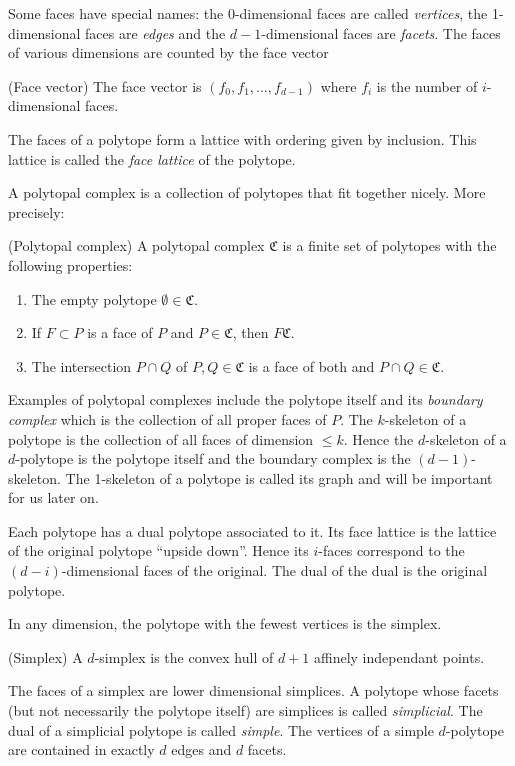 Some faces have special names: the 0-dimensional faces are called 
\textit{vertices}, the 1-dimensional faces are \textit{edges} and the 
$d-1$-dimensional faces are \textit{facets}. The faces of various dimensions 
are counted by the face vector
\begin{definition}
 (Face vector) The face vector is $(f_0, f_1, \dots, f_{d-1})$ where $f_i$ is 
the number of $i$-dimensional faces.
\end{definition}
 The faces of a polytope 
form a lattice with ordering given by inclusion. This lattice is called the 
\textit{face lattice} of the polytope.

A polytopal complex is a collection of polytopes that fit together nicely.
More precisely:
\begin{definition}
 (Polytopal complex) A polytopal complex $\mathfrak{C}$ is a finite set of 
polytopes with the following properties:
\begin{enumerate}
 \item The empty polytope $\emptyset \in \mathfrak{C}$.
  \item If $F \subset P$ is a face of $P$ and $P \in \mathfrak{C}$, then 
$F\mathfrak{C}$.
\item The intersection $P\cap Q$ of $P,Q \in \mathfrak{C}$ is a face of both 
and $P\cap Q \in \mathfrak{C}$.
\end{enumerate}

\end{definition}

Examples of polytopal complexes include the polytope itself and its 
\textit{boundary complex} which is the collection of all proper faces of $P$. 
The $k$-skeleton of a polytope is the collection of all faces of dimension 
$\leq k$. Hence the $d$-skeleton of a $d$-polytope is the polytope itself and 
the boundary complex is the $(d-1)$-skeleton. The 1-skeleton of a polytope is 
called its graph and will be important for us later on.

Each polytope has a dual polytope associated to it. Its face lattice is the 
lattice of the original polytope ``upside down''. Hence its $i$-faces 
correspond to the $(d-i)$-dimensional faces of the original. The dual of the 
dual is the original polytope. 

In any dimension, the polytope with the fewest vertices is the simplex. 
\begin{definition}
 (Simplex) A $d$-simplex is the convex hull of $d+1$ affinely independant 
points.
\end{definition}
The faces of a simplex are lower dimensional simplices. A polytope whose facets 
(but not necessarily the polytope itself) are simplices is called 
\textit{simplicial}. The dual of a simplicial polytope is called 
\textit{simple}. The vertices of a simple $d$-polytope are contained in exactly 
$d$ edges and $d$ facets.

